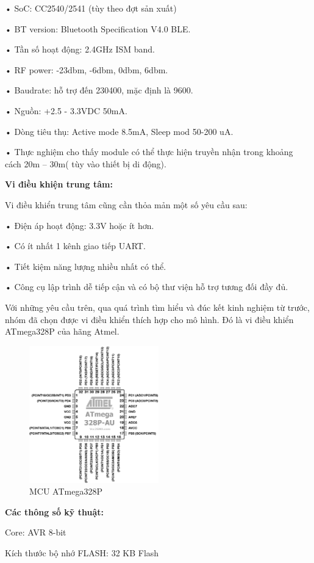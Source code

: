 • SoC: CC2540/2541 (tùy theo đợt sản xuất)

• BT version: Bluetooth Specification V4.0 BLE.

• Tần số hoạt động: 2.4GHz ISM band.

• RF power: -23dbm, -6dbm, 0dbm, 6dbm.

• Baudrate: hỗ trợ đến 230400, mặc định là 9600.

• Nguồn: +2.5 - 3.3VDC 50mA.

• Dòng tiêu thụ: Active mode 8.5mA, Sleep mod 50-200 uA.

• Thực nghiệm cho thấy module có thể thực hiện truyền nhận trong khoảng cách 20m – 30m( tùy vào thiết bị di động).

\textbf{Vi điều khiện trung tâm:}

Vi điều khiển trung tâm cũng cần thỏa mản một số yêu cầu sau:

• Điện áp hoạt động: 3.3V hoặc ít hơn.

• Có ít nhất 1 kênh giao tiếp UART.

• Tiết kiệm năng lượng nhiều nhất có thể.

• Công cụ lập trình dễ tiếp cận và có bộ thư viện hỗ trợ tương đối đầy đủ.

Với những yêu cầu trên, qua quá trình tìm hiểu và đúc kết kinh nghiệm từ trước, nhóm đã chọn được vi điều khiển thích hợp cho mô hình. Đó là vi điều khiển ATmega328P của hãng Atmel.

\begin{figure}[H]
	\centering    
	\includegraphics[width=0.5\textwidth]{atmega}
	\caption[MCU ATmega328P]{MCU ATmega328P}
	\label{fig: atmega}
\end{figure}

\textbf{Các thông số kỹ thuật:}

Core:	 AVR 8-bit

Kích thước bộ nhớ FLASH:	 32 KB Flash

